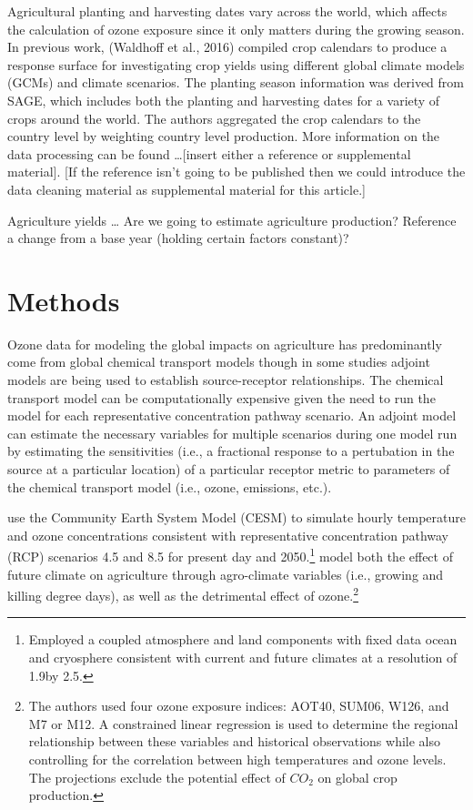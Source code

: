 \documentclass[10pt]{amsart}
\begin{document}
Agricultural planting and harvesting dates vary across the world, which affects the calculation of ozone exposure since it only matters during the growing season.
In previous work, \cite{} (Waldhoff et al., 2016) compiled crop calendars to produce a response surface for investigating crop yields using different global climate models (GCMs) and climate scenarios.
The planting season information was derived from SAGE, which includes both the planting and harvesting dates for a variety of crops around the world.
The authors aggregated the crop calendars to the country level by weighting country level production. 
More information on the data processing can be found \ldots [insert either a reference or supplemental material].
[If the reference isn't going to be published then we could introduce the data cleaning material as supplemental material for this article.] 

Agriculture yields \ldots
Are we going to estimate agriculture production? Reference a change from a base year (holding certain factors constant)?





\section{Methods}
Ozone data for modeling the global impacts on agriculture has predominantly come from global chemical transport models though in some studies adjoint models are being used to establish source-receptor relationships. 
The chemical transport model can be computationally expensive given the need to run the model for each representative concentration pathway scenario.
An adjoint model can estimate the necessary variables for multiple scenarios during one model run by estimating the sensitivities (i.e., a fractional response to a pertubation in the source at a particular location) of a particular receptor metric to parameters of the chemical transport model (i.e., ozone, emissions, etc.)\parencite{Lapina2015}.

\cite{Tai2014} use the Community Earth System Model (CESM) to simulate hourly temperature and ozone concentrations consistent with representative concentration pathway (RCP) scenarios 4.5 and 8.5 for present day and 2050.\footnote{Employed a coupled atmosphere and land components with fixed data ocean and cryosphere consistent with current and future climates at a resolution of 1.9\degree by 2.5\degree.}
\cite{Tai2014} model both the effect of future climate on agriculture through agro-climate variables (i.e., growing and killing degree days), as well as the detrimental effect of ozone.\footnote{The authors used four ozone exposure indices: AOT40, SUM06, W126, and M7 or M12. A constrained linear regression is used to determine the regional relationship between these variables and historical observations while also controlling for the correlation between high temperatures and ozone levels. The projections exclude the potential effect of $CO_2$ on global crop production.}  
\end{document}
